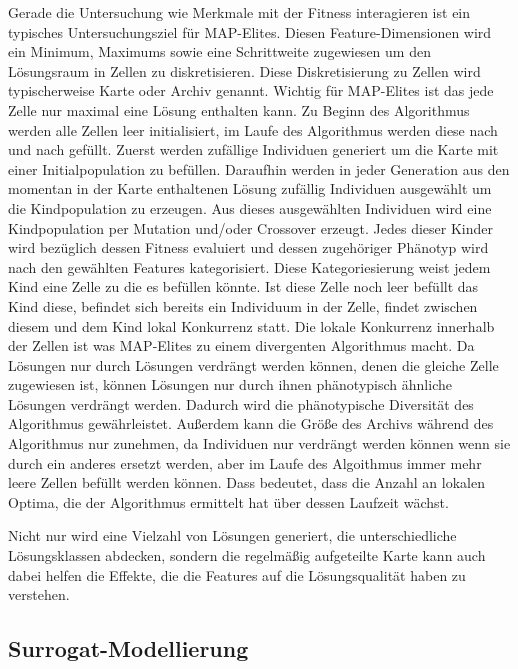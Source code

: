Gerade die Untersuchung wie Merkmale mit der Fitness interagieren ist ein typisches Untersuchungsziel für MAP-Elites.
Diesen Feature-Dimensionen wird ein Minimum, Maximums sowie eine Schrittweite zugewiesen um den Lösungsraum in Zellen zu diskretisieren.
Diese Diskretisierung zu Zellen wird typischerweise Karte oder Archiv genannt.
Wichtig für MAP-Elites ist das jede Zelle nur maximal eine Lösung enthalten kann.
Zu Beginn des Algorithmus werden alle Zellen leer initialisiert, im Laufe des Algorithmus werden diese nach und nach gefüllt.
Zuerst werden zufällige Individuen generiert um die Karte mit einer Initialpopulation zu befüllen.
Daraufhin werden in jeder Generation aus den momentan in der Karte enthaltenen Lösung zufällig Individuen ausgewählt um die Kindpopulation zu erzeugen.
Aus dieses ausgewählten Individuen wird eine Kindpopulation per Mutation und/oder Crossover erzeugt.
Jedes dieser Kinder wird bezüglich dessen Fitness evaluiert und dessen zugehöriger Phänotyp wird nach den gewählten Features kategorisiert.
Diese Kategoriesierung weist jedem Kind eine Zelle zu die es befüllen könnte.
Ist diese Zelle noch leer befüllt das Kind diese, befindet sich bereits ein Individuum in der Zelle, findet zwischen diesem und dem Kind lokal Konkurrenz statt.
Die lokale Konkurrenz innerhalb der Zellen ist was MAP-Elites zu einem divergenten Algorithmus macht.
Da Lösungen nur durch Lösungen verdrängt werden können, denen die gleiche Zelle zugewiesen ist, können Lösungen nur durch ihnen phänotypisch ähnliche Lösungen verdrängt werden.
Dadurch wird die phänotypische Diversität des Algorithmus gewährleistet.
Außerdem kann die Größe des Archivs während des Algorithmus nur zunehmen, da Individuen nur verdrängt werden können wenn sie durch ein anderes ersetzt werden, aber im Laufe des Algoithmus immer mehr leere Zellen befüllt werden können.
Dass bedeutet, dass die Anzahl an lokalen Optima, die der Algorithmus ermittelt hat über dessen Laufzeit wächst.

Nicht nur wird eine Vielzahl von Lösungen generiert, die unterschiedliche Lösungsklassen abdecken, sondern die regelmäßig aufgeteilte Karte kann auch dabei helfen die Effekte, die die Features auf die Lösungsqualität haben zu verstehen.


\subsection{Surrogat-Modellierung}

